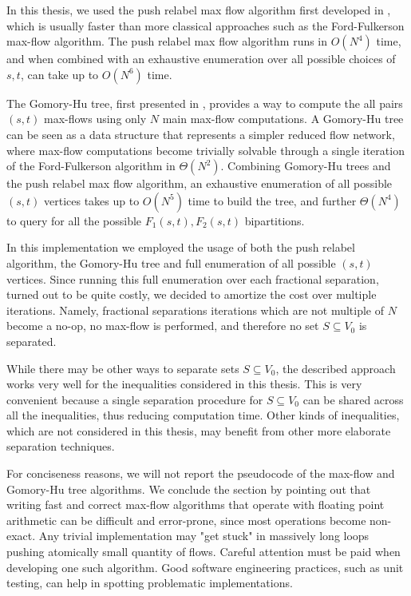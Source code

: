 In this thesis, we used the push relabel max flow algorithm first developed in \cite{goldberg1997}, which is usually faster than more classical approaches such as the Ford-Fulkerson max-flow algorithm.
The push relabel max flow algorithm runs in $O(N^4)$ time, and when combined with an exhaustive enumeration over all possible choices of $s, t$, can take up to $O(N^6)$ time.

The Gomory-Hu tree, first presented in \cite{gomory1961}, provides a way to compute the all pairs $(s, t)$ max-flows using only $N$ main max-flow computations.
A Gomory-Hu tree can be seen as a data structure that represents a simpler reduced flow network, where max-flow computations become trivially solvable through a single iteration of the Ford-Fulkerson algorithm in $\Theta(N^2)$.
Combining Gomory-Hu trees and the push relabel max flow algorithm, an exhaustive enumeration of all possible $(s, t)$ vertices takes up to $O(N^5)$ time to build the tree, and further $\Theta(N^4)$ to query for all the possible $F_1(s, t), F_2(s, t)$ bipartitions.

In this implementation we employed the usage of both the push relabel algorithm, the Gomory-Hu tree and full enumeration of all possible $(s, t)$ vertices.
Since running this full enumeration over each fractional separation, turned out to be quite costly, we decided to amortize the cost over multiple iterations.
Namely, fractional separations iterations which are not multiple of $N$ become a no-op, no max-flow is performed, and therefore no set $S \subseteq V_0$ is separated.

While there may be other ways to separate sets $S \subseteq V_0$, the described approach works very well for the inequalities considered in this thesis.
This is very convenient because a single separation procedure for $S \subseteq V_0$ can be shared across all the inequalities, thus reducing computation time.
Other kinds of inequalities, which are not considered in this thesis, may benefit from other more elaborate separation techniques.

For conciseness reasons, we will not report the pseudocode of
the max-flow and Gomory-Hu tree algorithms.
We conclude the section by pointing out that writing fast and correct max-flow algorithms that operate with floating point arithmetic can be difficult and error-prone, since most operations become non-exact.
Any trivial implementation may "get stuck" in massively long loops pushing atomically small quantity of flows.
Careful attention must be paid when developing one such algorithm.
Good software engineering practices, such as unit testing, can help in spotting problematic implementations.

